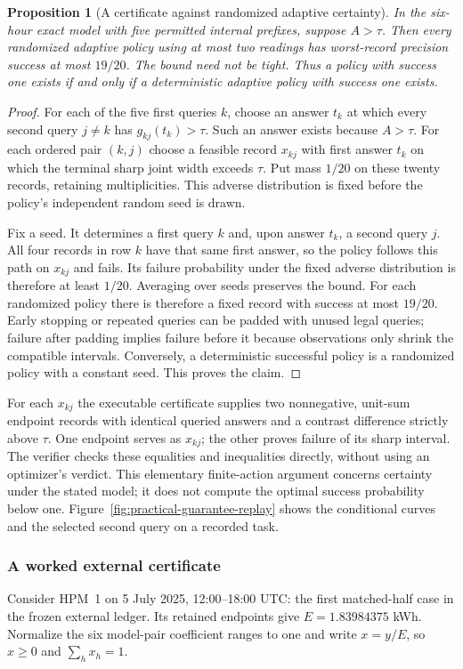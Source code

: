 \documentclass[12pt]{article}
\newtheorem{proposition}{Proposition}
\begin{document}
\begin{proposition}[A certificate against randomized adaptive certainty]
\label{prop:assurance-feasibility}
In the six-hour exact model with five permitted internal prefixes,
suppose $A>\tau$. Then every randomized
adaptive policy using at most two readings has worst-record precision
success at most $19/20$. The bound need not be tight. Thus a policy with
success one exists if and only if a deterministic adaptive policy with
success one exists.
\end{proposition}
\begin{proof}
For each of the five first queries $k$, choose an answer $t_k$ at which
every second query $j\ne k$ has $g_{kj}(t_k)>\tau$. Such an answer exists
because $A>\tau$. For each ordered pair $(k,j)$ choose a feasible record
$x_{kj}$ with first answer $t_k$ on which the terminal sharp joint width
exceeds $\tau$. Put mass $1/20$ on these twenty records, retaining
multiplicities. This adverse distribution is fixed before the policy's
independent random seed is drawn.

Fix a seed. It determines a first query $k$ and, upon answer $t_k$, a
second query $j$. All four records in row $k$ have that same first answer,
so the policy follows this path on $x_{kj}$ and fails. Its failure
probability under the fixed adverse distribution is therefore at least
$1/20$. Averaging over seeds preserves the bound. For each randomized
policy there is therefore a fixed record with success at most $19/20$.
Early stopping or repeated queries can be padded with unused legal queries;
failure after padding implies failure before it because observations only
shrink the compatible intervals. Conversely, a deterministic successful
policy is a randomized policy with a constant seed. This proves the claim.
\end{proof}

For each $x_{kj}$ the executable certificate supplies two nonnegative,
unit-sum endpoint records with identical queried answers and a contrast
difference strictly above $\tau$. One endpoint serves as $x_{kj}$; the
other proves failure of its sharp interval. The verifier checks these
equalities and inequalities directly, without using an optimizer's verdict.
This elementary finite-action argument concerns certainty under the stated
model; it does not compute the optimal success probability below one.
Figure~\ref{fig:practical-guarantee-replay} shows the conditional curves
and the selected second query on a recorded task.
\subsubsection{A worked external certificate}
\label{sec:worked-joint-certificate}
Consider HPM~1 on 5 July 2025, 12:00--18:00 UTC: the first matched-half
case in the frozen external ledger. Its retained endpoints give
$E=1.83984375$ kWh. Normalize the six model-pair coefficient ranges to one
and write $x=y/E$, so $x\geq0$ and $\sum_hx_h=1$.
\end{document}
